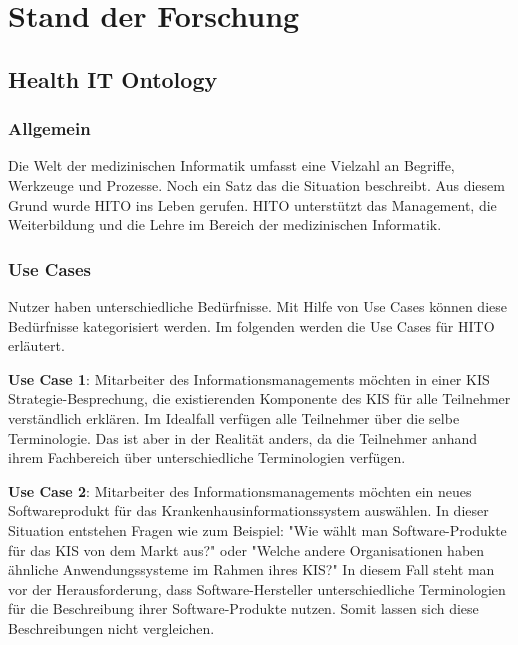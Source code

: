 \chapter{Stand der Forschung}\label{ch:relatedWork}

\section{Health IT Ontology}

\subsection{Allgemein}

Die Welt der medizinischen Informatik umfasst eine Vielzahl an Begriffe, Werkzeuge und Prozesse. 
Noch ein Satz das die Situation beschreibt.
Aus diesem Grund wurde \ac{HITO} ins Leben gerufen.
HITO unterstützt das Management, die Weiterbildung und die Lehre im Bereich der medizinischen Informatik.


\subsection{Use Cases}

Nutzer haben unterschiedliche Bedürfnisse.
Mit Hilfe von Use Cases können diese Bedürfnisse kategorisiert werden.
Im folgenden werden die Use Cases für HITO erläutert. \newline

\textbf{Use Case 1}: Mitarbeiter des Informationsmanagements möchten in einer \ac{KIS} Strategie-Besprechung, die existierenden Komponente des \ac{KIS} für alle Teilnehmer verständlich erklären.
Im Idealfall verfügen alle Teilnehmer über die selbe Terminologie.
Das ist aber in der Realität anders, da die Teilnehmer anhand ihrem Fachbereich über unterschiedliche Terminologien verfügen. \newline

\textbf{Use Case 2}:  Mitarbeiter des Informationsmanagements möchten ein neues Softwareprodukt für das Krankenhausinformationssystem auswählen.
 In dieser Situation entstehen Fragen wie zum Beispiel: "Wie wählt man Software-Produkte für das \ac{KIS} von dem Markt aus?" oder "Welche andere Organisationen haben ähnliche Anwendungssysteme im Rahmen ihres \ac{KIS}?"
 In diesem Fall steht man vor der Herausforderung, dass Software-Hersteller unterschiedliche Terminologien für die Beschreibung ihrer Software-Produkte nutzen.
 Somit lassen sich diese Beschreibungen nicht vergleichen. \newline

